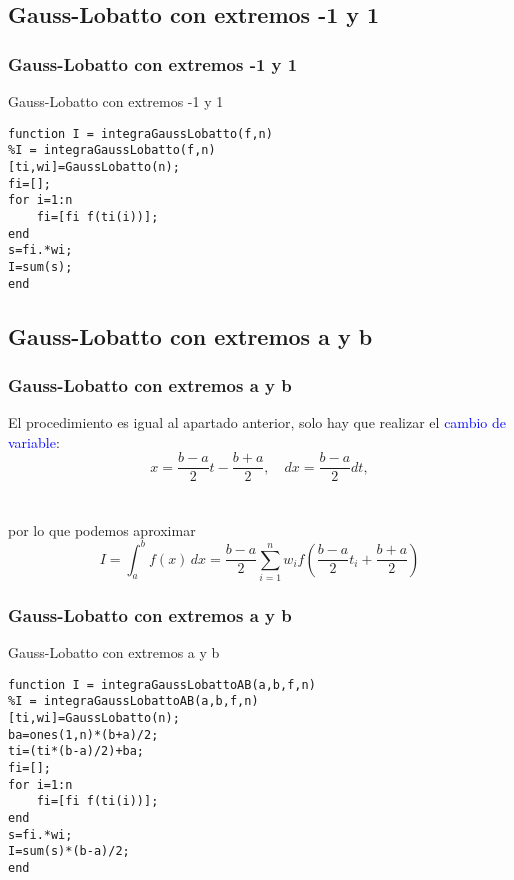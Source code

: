 \documentclass{beamer}
\begin{document}
\subsection{Gauss-Lobatto con extremos -1 y 1}
\begin{frame}[fragile] 
\frametitle{Gauss-Lobatto con extremos -1 y 1}
\begin{exampleblock}{Gauss-Lobatto con extremos -1 y 1}
\begin{verbatim}
function I = integraGaussLobatto(f,n)
%I = integraGaussLobatto(f,n)
[ti,wi]=GaussLobatto(n);
fi=[];
for i=1:n
    fi=[fi f(ti(i))];
end
s=fi.*wi;
I=sum(s);
end
\end{verbatim}
\end{exampleblock}
\end{frame}


\subsection{Gauss-Lobatto con extremos a y b}
\begin{frame}
\frametitle{Gauss-Lobatto con extremos a y b}
El procedimiento es igual al apartado anterior, solo hay que realizar el \textcolor{blue}{cambio de variable}:
\[x=\frac{b-a}{2}t-\frac{b+a}{2},\quad dx=\frac{b-a}{2}dt,\]
\\~\\
por lo que podemos aproximar
\[\displaystyle I=\int_{a}^{b} \! f(x)  \,dx = \frac{b-a}{2} \sum_{i=1}^{n}w_i f \left(\frac{b-a}{2}t_i + \frac{b+a}{2} \right)\]
\end{frame}


\begin{frame}[fragile]
\frametitle{Gauss-Lobatto con extremos a y b}
\begin{exampleblock}{Gauss-Lobatto con extremos a y b}
\begin{verbatim}
function I = integraGaussLobattoAB(a,b,f,n)
%I = integraGaussLobattoAB(a,b,f,n)
[ti,wi]=GaussLobatto(n);
ba=ones(1,n)*(b+a)/2;
ti=(ti*(b-a)/2)+ba;
fi=[];
for i=1:n
    fi=[fi f(ti(i))];
end
s=fi.*wi;
I=sum(s)*(b-a)/2;
end\end{verbatim}
\end{exampleblock}
\end{frame}
\end{document}
